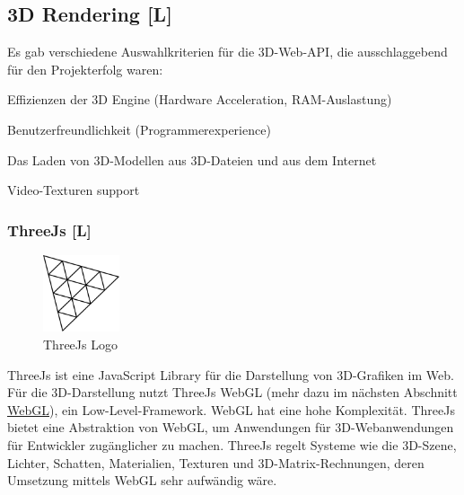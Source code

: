 \subsection{3D Rendering [L]}
Es gab verschiedene Auswahlkriterien für die 3D-Web-API, die ausschlaggebend für den Projekterfolg waren:
\begin{compactitem}
  \item Effizienzen der 3D Engine (Hardware Acceleration, RAM-Auslastung)
  \item Benutzerfreundlichkeit (Programmerexperience)
  \item Das Laden von 3D-Modellen aus 3D-Dateien und aus dem Internet
  \item Video-Texturen support
\end{compactitem}

\subsubsection{ThreeJs [L]}
\begin{figure}
    \begin{center}
      \includegraphics[width=0.2\textwidth]{pics/threeJS.png}
     \caption{ThreeJs Logo}
    \end{center}
\end{figure}
ThreeJs ist eine JavaScript Library für die Darstellung von 3D-Grafiken im Web. Für die 3D-Darstellung nutzt ThreeJs WebGL (mehr dazu im nächsten Abschnitt \hyperref[ch::webgl]{WebGL}), ein Low-Level-Framework. WebGL hat eine hohe Komplexität. ThreeJs bietet eine Abstraktion von WebGL, um Anwendungen für 3D-Webanwendungen für Entwickler zugänglicher zu machen.
ThreeJs regelt Systeme wie die 3D-Szene, Lichter, Schatten, Materialien, Texturen und 3D-Matrix-Rechnungen, deren Umsetzung mittels WebGL sehr aufwändig wäre. \cite[ThreeJs fundamentals]{ThreeJsFund}

